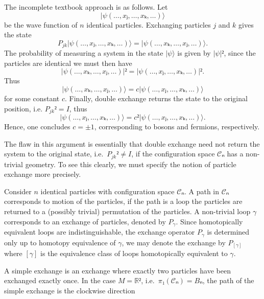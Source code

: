 \begin{example}\label{ex:crude exchange}
  The incomplete textbook approach is as follows. Let
  \begin{equation}
    |ψ(…,xⱼ,…,xₖ,…)⟩
  \end{equation}
  be the wave function of $n$ identical particles. Exchanging particles $j$ and $k$ gives the state
  \begin{equation}
    P_{jk} |ψ(…,xⱼ,…,xₖ,…)⟩ = |ψ(…,xₖ,…,xⱼ,…)⟩.
  \end{equation}
  The probability of measuring a system in the state $|ψ⟩$ is given by $|ψ|²$, since the particles are identical we must then have
  \begin{equation}
    |ψ(…,xₖ,…,xⱼ,…)|² = |ψ(…,xⱼ,…,xₖ,…)|².
  \end{equation}
  Thus
  \begin{equation}
    |ψ(…,xₖ,…,xⱼ,…)⟩ = c |ψ(…,xⱼ,…,xₖ,…)⟩
  \end{equation}
  for some constant $c$. Finally, double exchange returns the state to the original position, i.e. $P_{jk}² = I$, thus
  \begin{equation}
    |ψ(…,xⱼ,…,xₖ,…)⟩ = c² |ψ(…,xⱼ,…,xₖ,…)⟩.
  \end{equation}
  Hence, one concludes $c = ±1$, corresponding to bosons and fermions, respectively.
\end{example}

The flaw in this argument is essentially that double exchange need not return the system to the original state, i.e.\ $P_{jk}² ≠ I$, if the configuration space $𝒞ₙ$ has a non-trivial geometry. To see this clearly, we must specify the notion of particle exchange more precisely.

\begin{definition}[Exchange]
  Consider $n$ identical particles with configuration space $𝒞ₙ$. A path in $𝒞ₙ$ corresponds to motion of the particles, if the path is a loop the particles are returned to a (possibly trivial) permutation of the particles. A non-trivial loop $γ$ corresponds to an exchange of particles, denoted by $P_γ$. Since homotopically equivalent loops are indistinguishable, the exchange operator $P_γ$ is determined only up to homotopy equivalence of $γ$, we may denote the exchange by $P_{[γ]}$ where $[γ]$ is the equivalence class of loops homotopically equivalent to $γ$.
\end{definition}

\begin{definition}
  A simple exchange is an exchange where exactly two particles have been exchanged exactly once. In the case $M=ℝ²$, i.e.\ $π₁(𝒞ₙ) = Bₙ$, the path of the simple exchange is the clockwise direction
\end{definition}

